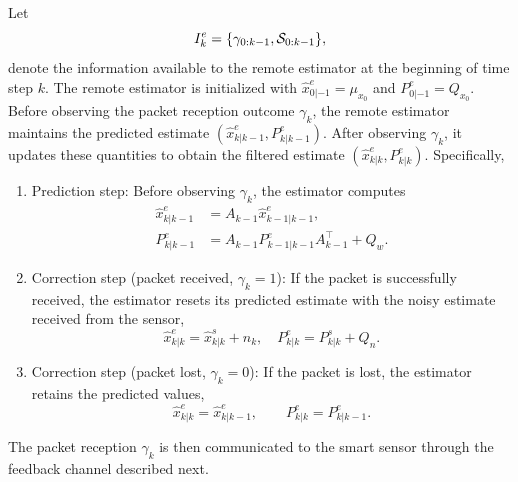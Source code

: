 \documentclass[letterpaper, 10 pt, conference]{ieeeconf}
\begin{document}
Let
\begin{equation}\label{info.RE.set}
    I_k^e=\{\gamma_{0:k-1}, {\cal S}_{0:k-1}\},
\end{equation}
denote the information available to the remote estimator at the beginning of time step $k$.
The remote estimator is initialized with $\hat{x}^e_{0|-1}=\mu_{x_0}$ and $P^e_{0|-1}=Q_{x_0}$.
Before observing the packet reception outcome $\gamma_k$, the remote estimator maintains the predicted estimate $(\hat{x}^e_{k|k-1},P^e_{k|k-1})$. After observing $\gamma_k$, it updates these quantities to obtain the filtered estimate $(\hat{x}^e_{k|k},P^e_{k|k})$. Specifically,
\begin{enumerate}
    \item Prediction step:
    Before observing $\gamma_k$, the estimator computes 
    \begin{subequations}
    \begin{align}
        \hat{x}^e_{k|k-1}&=A_{k-1}\hat{x}^e_{k-1|k-1},\\
        P_{k|k-1}^e &= A_{k-1}P^e_{k-1|k-1}A_{k-1}^\top+Q_w.
    \end{align}
        \end{subequations}
    \item Correction step (packet received, $\gamma_k=1$): If the packet is successfully received, the estimator resets its predicted estimate with the noisy estimate received from the sensor,
    \begin{equation}
        \hat{x}^{e}_{k|k} = \hat{x}^s_{k|k} + n_k, \quad
        P^e_{k|k} = P^s_{k|k} + Q_n.
    \end{equation}
    \item Correction step (packet lost, $\gamma_k=0$): If the packet is lost, the estimator retains the predicted values,
    \begin{equation}
        \hat{x}^{e}_{k|k} = \hat{x}^{e}_{k|k-1}, \qquad
        P^{e}_{k|k} = P^{e}_{k|k-1}.
    \end{equation}
\end{enumerate}

The packet reception $\gamma_k$ is then communicated to the smart sensor through the feedback channel described next.
\end{document}
